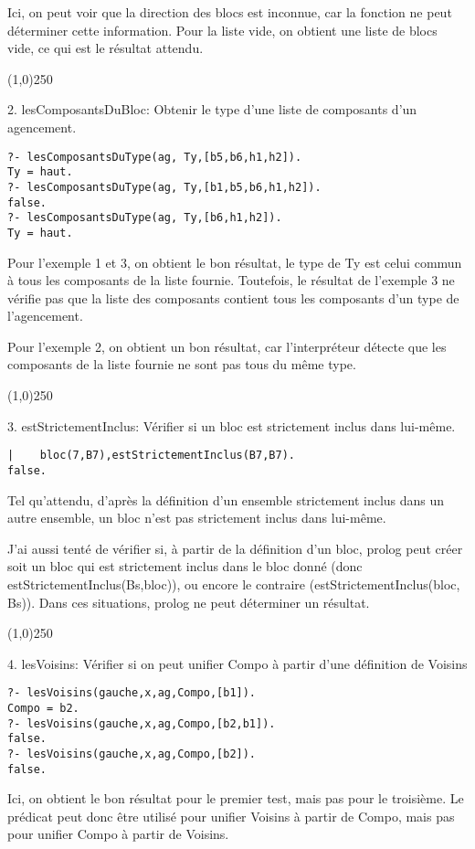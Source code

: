 \documentclass[letterpaper,11pt]{letter}
\begin{document}
Ici, on peut voir que la direction des blocs est inconnue, car la fonction ne peut déterminer cette
information. Pour la liste vide, on obtient une liste de blocs vide, ce qui est le résultat attendu.

\begin{center}
\line(1,0){250}
\end{center}

2. lesComposantsDuBloc: Obtenir le type d'une liste de composants d'un agencement.
\begin{verbatim}
?- lesComposantsDuType(ag, Ty,[b5,b6,h1,h2]).
Ty = haut.
?- lesComposantsDuType(ag, Ty,[b1,b5,b6,h1,h2]).
false.
?- lesComposantsDuType(ag, Ty,[b6,h1,h2]).
Ty = haut.
\end{verbatim}

Pour l'exemple 1 et 3, on obtient le bon résultat, le type de Ty est celui commun à tous les composants
de la liste fournie. Toutefois, le résultat de l'exemple 3 ne vérifie pas que la liste des composants contient
tous les composants d'un type de l'agencement.

Pour l'exemple 2, on obtient un bon résultat, car l'interpréteur détecte que les composants de la liste fournie
ne sont pas tous du même type.

\begin{center}
\line(1,0){250}
\end{center}

3. estStrictementInclus: Vérifier si un bloc est strictement inclus dans lui-même.
\begin{verbatim}
|    bloc(7,B7),estStrictementInclus(B7,B7).
false.
\end{verbatim}

Tel qu'attendu, d'après la définition d'un ensemble strictement inclus dans un autre ensemble,
un bloc n'est pas strictement inclus dans lui-même.

J'ai aussi tenté de vérifier si, à partir de la définition d'un bloc, prolog peut créer soit un
bloc qui est strictement inclus dans le bloc donné (donc estStrictementInclus(Bs,bloc)), ou 
encore le contraire (estStrictementInclus(bloc, Bs)). Dans ces situations, prolog ne peut
déterminer un résultat.

\begin{center}
\line(1,0){250}
\end{center}

4. lesVoisins: Vérifier si on peut unifier Compo à partir d'une définition de Voisins
\begin{verbatim}
?- lesVoisins(gauche,x,ag,Compo,[b1]).
Compo = b2.
?- lesVoisins(gauche,x,ag,Compo,[b2,b1]).
false.
?- lesVoisins(gauche,x,ag,Compo,[b2]).
false.
\end{verbatim}

Ici, on obtient le bon résultat pour le premier test, mais pas pour le troisième. Le prédicat peut
donc être utilisé pour unifier Voisins à partir de Compo, mais pas pour unifier Compo à partir de Voisins.
\end{document}
